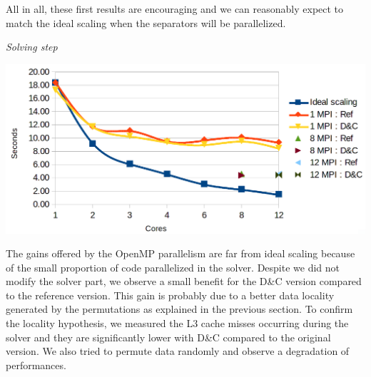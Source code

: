 \documentclass{IOS-Book-Article}
\begin{document}
All in all, these first results are encouraging and we can reasonably expect to match the ideal scaling when the separators will be parallelized.

\emph{Solving step}
\begin{center}
 \includegraphics[scale=0.2]{Laplacian_solver_time.png}
\end{center}
The gains offered by the OpenMP parallelism are far from ideal scaling because of the small proportion of code parallelized in the solver.
Despite we did not modify the solver part, we observe a small benefit for the D\&C version compared to the reference version.
This gain is probably due to a better data locality generated by the permutations as explained in the previous section.
To confirm the locality hypothesis, we measured the L3 cache misses occurring during the solver and they are significantly lower with D\&C compared to the original version.
We also tried to permute data randomly and observe a degradation of performances.
\end{document}

